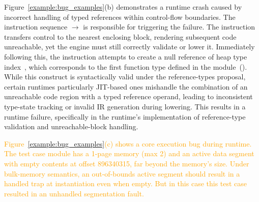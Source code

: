 \documentclass[lettersize,journal]{IEEEtran}
\begin{document}
Figure~\ref{example:bug_examples}(b) demonstrates a runtime crash caused by incorrect handling of typed references within control-flow boundaries. 
The instruction sequence  $\rightarrow$  is responsible for triggering the failure. 
The  instruction transfers control to the nearest enclosing block, rendering subsequent code unreachable, yet the engine must still correctly validate or lower it. 
Immediately following this, the instruction  attempts to create a null reference of heap type index~, which corresponds to the first function type defined in the module~(). 
While this construct is syntactically valid under the reference-types proposal, certain runtimes particularly JIT-based ones mishandle the combination of an unreachable code region with a typed reference operand, leading to inconsistent type-state tracking or invalid IR generation during lowering. 
This results in a runtime failure, specifically in the runtime’s implementation of reference-type validation and unreachable-block handling.

\textcolor{orange}{Figure~\ref{example:bug_examples}(c) shows a core execution bug during runtime. The test case module has a 1-page memory (max 2) and an active data segment with empty contents at offset 896340315, far beyond the memory’s size. Under bulk-memory semantics, an out-of-bounds active segment should result in a handled trap at instantiation even when empty. But in this case this test case resulted in an unhandled segmentation fault.}

\end{document}

